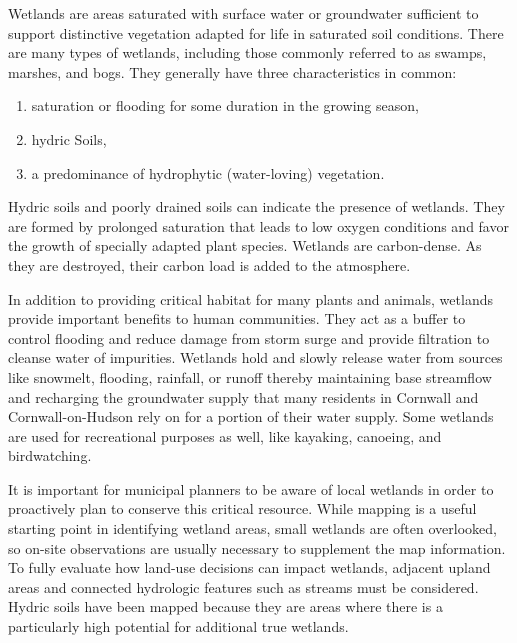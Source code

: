 \label{sec:Wetlands_Why}
Wetlands are areas saturated with surface water or groundwater sufficient to support distinctive vegetation adapted for life in saturated soil conditions. There are many types of wetlands, including those commonly referred to as swamps, marshes, and bogs. They generally have three characteristics in common:
\begin{enumerate}
  \item saturation or flooding for some duration in the growing season,
  \item hydric Soils,
  \item a predominance of hydrophytic (water-loving) vegetation.
\end{enumerate} %
Hydric soils and poorly drained soils can indicate the presence of wetlands. They are formed by prolonged saturation that leads to low oxygen conditions and favor the growth of specially adapted plant species. Wetlands are carbon-dense. As they are destroyed, their carbon load is added to the atmosphere.

In addition to providing critical habitat for many plants and animals, wetlands provide important benefits to human communities. They act as a buffer to control flooding and reduce damage from storm surge and provide filtration to cleanse water of impurities. Wetlands hold and slowly release water from sources like snowmelt, flooding, rainfall, or runoff thereby maintaining base streamflow and recharging the groundwater supply that many residents in Cornwall and Cornwall-on-Hudson rely on for a portion of their water supply. Some wetlands are used for recreational purposes as well, like kayaking, canoeing, and birdwatching. 

It is important for municipal planners to be aware of local wetlands in order to proactively plan to conserve this critical resource. While mapping is a useful starting point in identifying wetland areas, small wetlands are often overlooked, so on-site observations are usually necessary to supplement the map information. To fully evaluate how land-use decisions can impact wetlands, adjacent upland areas and connected hydrologic features such as streams must be considered. Hydric soils have been mapped because they are areas where there is a particularly high potential for additional true wetlands.

